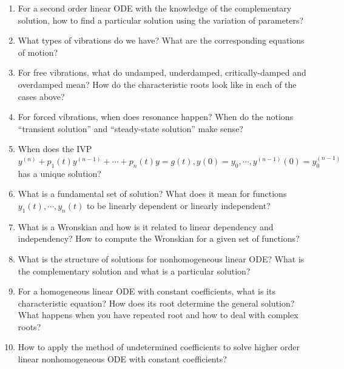 \documentclass[11pt]{article}
\begin{document}
\begin{enumerate}
\item For a second order linear ODE with the knowledge of the complementary solution, how to find a particular solution using the variation of parameters?
\item What types of vibrations do we have? What are the corresponding equations of motion? 
\item For free vibrations, what do undamped, underdamped, critically-damped and overdamped mean? How do the characteristic roots look like in each of the cases above?
\item For forced vibrations, when does resonance happen? When do the notions ``transient solution'' and ``steady-state solution'' make sense?
\item When does the IVP $y^{(n)} + p_1(t)y^{(n-1)} + \cdots + p_n (t)y = g(t), y(0) = y_0 , \cdots , y^{(n-1)}(0) =y^{(n-1)}_0$
has a unique solution?
\item What is a fundamental set of solution? What does it mean for functions $y_1 (t), \cdots , y_n(t)$ to be linearly dependent or linearly independent? 
\item What is a Wronskian and how is it related to linear dependency and independency? How
to compute the Wronskian for a given set of functions?
\item What is the structure of solutions for nonhomogeneous linear ODE? What is the complementary solution and what is a particular solution?
\item For a homogeneous linear ODE with constant coefficients, what is its characteristic equation? How does its root determine the general solution? What happens when you have
repeated root and how to deal with complex roots?
\item How to apply the method of undetermined coefficients to solve higher order linear  nonhomogeneous ODE with constant coefficients?
\end{enumerate}
\end{document}
